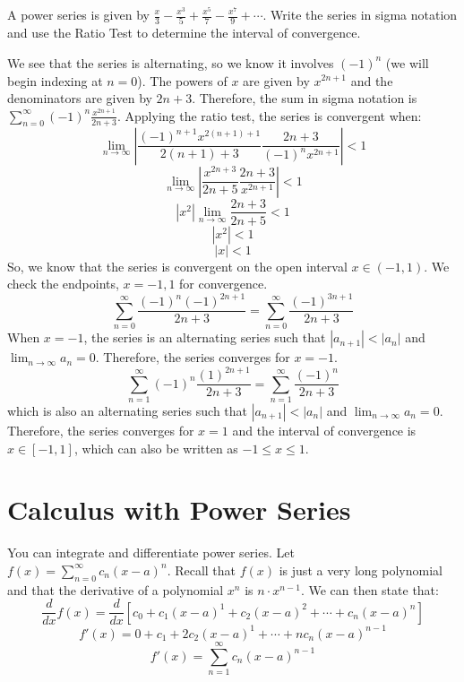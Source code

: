 \begin{Exercise} A power series is given by 
$\frac{x}{3} - \frac{x^3}{5} + \frac{x^5}{7} - \frac{x^7}{9} + \cdots$. Write 
the series in sigma notation and use the Ratio Test to determine the interval 
of convergence.
\end{Exercise}

\begin{Answer}[ref = radconv2]
We see that the series is alternating, so we know it involves $(-1)^n$ (we 
will begin indexing at $n = 0$). The powers of $x$ are given by $x^{2n+1}$ and 
the denominators are given by $2n + 3$. Therefore, the sum in sigma notation 
is $\sum_{n=0}^\infty (-1)^n \frac{x^{2n+1}}{2n+3}$. Applying the ratio test, 
the series is convergent when:
$$\lim_{n \to \infty} \left| \frac{(-1)^{n+1} x^{2(n+1)+1}}{2(n+1)+3} \frac{2n+
3}{(-1)^n x^{2n+1}} \right| < 1$$
$$\lim_{n \to \infty} \left| \frac{x^{2n+3}}{2n+5} \frac{2n+3}{x^{2n+1}} 
\right| < 1$$
$$\left| x^2 \right| \lim_{n \to \infty} \frac{2n+3}{2n+5} < 1$$
$$\left| x^2 \right| < 1$$
$$\left| x \right| < 1$$
So, we know that the series is convergent on the open interval $x \in (-1, 1)$. 
We check the endpoints, $x = -1, 1$ for convergence. 
$$\sum_{n=0}^\infty \frac{(-1)^n (-1)^{2n+1}}{2n+3} = \sum_{n=0}^\infty \frac{
(-1)^{3n+1}}{2n+3}$$
When $x = -1$, the series is an alternating series such that $\left| a_{n+1} 
\right| < \left|a_n \right|$ and $\lim_{n \to \infty} a_n = 0$. Therefore, the 
series converges for $x = -1$.
$$\sum_{n=1}^\infty (-1)^n \frac{(1)^{2n+1}}{2n+3} = \sum_{n=1}^\infty \frac{
(-1)^n}{2n+3}$$
which is also an alternating series such that $\left| a_{n+1} \right| < \left| 
a_n \right|$ and $\lim_{n \to \infty} a_n = 0$. Therefore, the series 
converges for $x = 1$ and the interval of convergence is $x \in [-1, 1]$, 
which can also be written as $-1 \leq x \leq 1$. 
\end{Answer}

\section{Calculus with Power Series}
You can integrate and differentiate power series. Let $f(x) = \sum_{n=0}^\infty 
c_n (x-a)^n$. Recall that $f(x)$ is just a very long polynomial and that the 
derivative of a polynomial $x^n$ is $n \cdot x^{n-1}$. We can then state that:
$$\frac{d}{dx}f(x) = \frac{d}{dx} \left[c_0 + c_1(x-a)^1 + c_2(x-a)^2 + \cdots 
+ c_n(x-a)^n \right]$$
$$f'(x) = 0 + c_1 + 2c_2(x-a)^1 + \cdots + n c_n(x-a)^{n-1}$$
$$f'(x) = \sum_{n=1}^\infty c_n(x-a)^{n-1}$$


